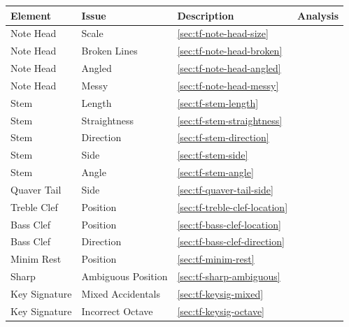 \begin{table}[H]
    \renewcommand{\arraystretch}{1.8}
    \centering
    \begin{tabularx}{\textwidth}{ llll }
        \toprule

        Element & Issue & Description & Analysis \\
        \midrule
        Note Head       & Scale                  & \cref{sec:tf-note-head-size}              & \\
        Note Head       & Broken Lines           & \cref{sec:tf-note-head-broken}            & \\
        Note Head       & Angled                 & \cref{sec:tf-note-head-angled}            & \\
        Note Head       & Messy                  & \cref{sec:tf-note-head-messy}             & \\
        Stem            & Length                 & \cref{sec:tf-stem-length}                 & \\
        Stem            & Straightness           & \cref{sec:tf-stem-straightness}           & \\
        Stem            & Direction              & \cref{sec:tf-stem-direction}              & \\
        Stem            & Side                   & \cref{sec:tf-stem-side}                   & \\
        Stem            & Angle                  & \cref{sec:tf-stem-angle}                  & \\
        Quaver Tail     & Side                   & \cref{sec:tf-quaver-tail-side}            & \\
        Treble Clef     & Position               & \cref{sec:tf-treble-clef-location}        & \\
        Bass Clef       & Position               & \cref{sec:tf-bass-clef-location}          & \\
        Bass Clef       & Direction              & \cref{sec:tf-bass-clef-direction}         & \\
        Minim Rest      & Position               & \cref{sec:tf-minim-rest}                  & \\
        Sharp           & Ambiguous Position     & \cref{sec:tf-sharp-ambiguous}             & \\
        Key Signature   & Mixed Accidentals      & \cref{sec:tf-keysig-mixed}                & \\
        Key Signature   & Incorrect Octave       & \cref{sec:tf-keysig-octave}               & \\

\end{tabularx}
\end{table}
